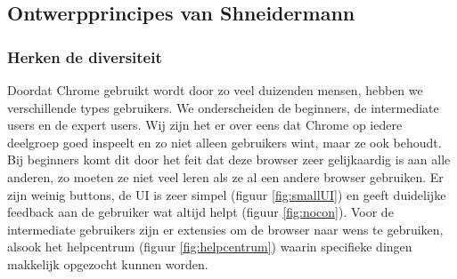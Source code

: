 \documentclass[12pt]{article}
\begin{document}
\subsection{Ontwerpprincipes van Shneidermann}
\subsubsection{Herken de diversiteit}
Doordat Chrome gebruikt wordt door zo veel duizenden mensen, hebben we verschillende types gebruikers. We onderscheiden de beginners, de intermediate users en de expert users. Wij zijn het er over eens dat Chrome op iedere deelgroep goed inspeelt en zo niet alleen gebruikers wint, maar ze ook behoudt. Bij beginners komt dit door het feit dat deze browser zeer gelijkaardig is aan alle anderen, zo moeten ze niet veel leren als ze al een andere browser gebruiken. Er zijn weinig buttons, de UI is zeer simpel (figuur \ref{fig:smallUI}) en geeft duidelijke feedback aan de gebruiker wat altijd helpt (figuur \ref{fig:nocon}). Voor de intermediate gebruikers zijn er extensies om de browser naar wens te gebruiken, alsook het helpcentrum (figuur \ref{fig:helpcentrum}) waarin specifieke dingen makkelijk opgezocht kunnen worden.
\end{document}
